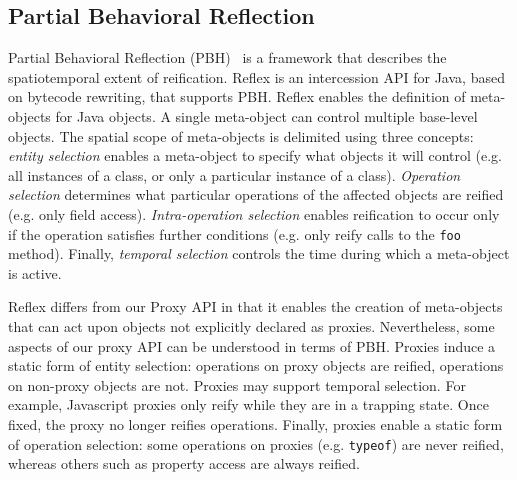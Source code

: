 \documentclass{sig-alternate}
\begin{document}




\subsection{Partial Behavioral Reflection}

Partial Behavioral Reflection (PBH)~\cite{tanter03pbh} is a framework that describes the spatiotemporal extent of reification. Reflex is an intercession API for Java, based on bytecode rewriting, that supports PBH. Reflex enables the definition of meta-objects for Java objects. A single meta-object can control multiple base-level objects. The spatial scope of meta-objects is delimited using three concepts: \emph{entity selection} enables a meta-object to specify what objects it will control (e.g. all instances of a class, or only a particular instance of a class). \emph{Operation selection} determines what particular operations of the affected objects are reified (e.g. only field access). \emph{Intra-operation selection} enables reification to occur only if the operation satisfies further conditions (e.g. only reify calls to the \texttt{foo} method). Finally, \emph{temporal selection} controls the time during which a meta-object is active.

Reflex differs from our Proxy API in that it enables the creation of meta-objects that can act upon objects not explicitly declared as proxies. Nevertheless, some aspects of our proxy API can be understood in terms of PBH. Proxies induce a static form of entity selection: operations on proxy objects are reified, operations on non-proxy objects are not. Proxies may support temporal selection. For example, Javascript proxies only reify while they are in a trapping state. Once fixed, the proxy no longer reifies operations. Finally, proxies enable a static form of operation selection: some operations on proxies (e.g. \texttt{typeof}) are never reified, whereas others such as property access are always reified.
\end{document}
